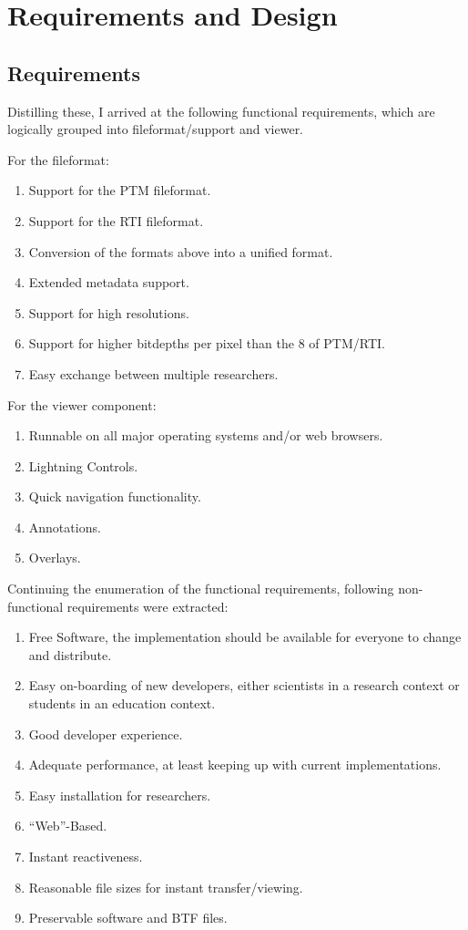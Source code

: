\section{Requirements and Design}
\subsection{Requirements}
Distilling these, I arrived at the following functional requirements, which are
logically grouped into fileformat/support and viewer.

For the fileformat:
\begin{enumerate}
\item Support for the PTM\cite*{library_of_congress_polynomial_2018}  fileformat.
\item Support for the RTI\cite*{library_of_congress_reflectance_2018} fileformat.
\item Conversion of the formats above into a unified format.
\item Extended metadata support.
\item Support for high resolutions.
\item Support for higher bitdepths per pixel than the 8 of PTM/RTI.
\item Easy exchange between multiple researchers.
\end{enumerate}

For the viewer component:
\begin{enumerate}[resume]
\item Runnable on all major operating systems and/or web browsers.\label{req_system}
\item Lightning Controls.
\item Quick navigation functionality.
\item Annotations.
\item Overlays.
\end{enumerate}

Continuing the enumeration of the functional requirements, following non-functional
requirements were extracted:
\begin{enumerate}[resume]
\item  Free Software, the implementation should be available for everyone to
  change and distribute. \label{req_os}
\item Easy on-boarding of new developers, either scientists in a research context
  or students in an education context. \label{req_easy}
\item Good developer experience. \label{req_dx}
\item Adequate performance, at least keeping up with current
  implementations. \label{req_performance}
\item Easy installation for
  researchers. \label{req_install}
\item ``Web''-Based.
\item Instant reactiveness. \label{req_react}
\item Reasonable file sizes for instant transfer/viewing.
\item Preservable software and BTF files.\label{req_preserve}
\end{enumerate}

